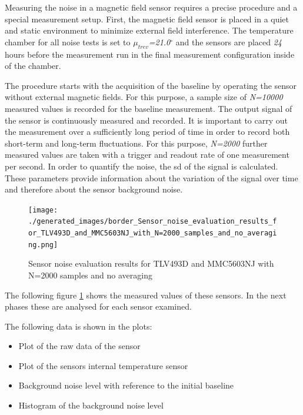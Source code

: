 Measuring the noise in a magnetic field sensor requires a precise
procedure and a special measurement setup. First, the magnetic field
sensor is placed in a quiet and static environment to minimize external
field interference. The temperature chamber for all noise tests is set
to \emph{\(\mu_{trev}\)=21.0\(^{\circ}\)} and the sensors are placed
\emph{24} hours before the measurement run in the final measurement
configuration inside of the chamber.

The procedure starts with the acquisition of the baseline by operating
the sensor without external magnetic fields. For this purpose, a sample
size of \emph{N=10000} measured values is recorded for the baseline
measurement. The output signal of the sensor is continuously measured
and recorded. It is important to carry out the measurement over a
sufficiently long period of time in order to record both short-term and
long-term fluctuations. For this purpose, \emph{N=2000} further measured
values are taken with a trigger and readout rate of one measurement per
second. In order to quantify the noise, the \gls{sd} of the signal is
calculated. These parameters provide information about the variation of
the signal over time and therefore about the sensor background noise.

\begin{figure}
\centering
\texttt{[image: ./generated\_images/border\_Sensor\_noise\_evaluation\_results\_for\_TLV493D\_and\_MMC5603NJ\_with\_N=2000\_samples\_and\_no\_averaging.png]}
\caption{Sensor noise evaluation results for TLV493D and MMC5603NJ with
N=2000 samples and no averaging
\label{Sensor_noise_evaluation_results_for_TLV493D_and_MMC5603NJ_with_N=2000_samples_and_no_averaging.png}}
\end{figure}

The following figure
\ref{Sensor_noise_evaluation_results_for_TLV493D_and_MMC5603NJ_with_N=2000_samples_and_no_averaging.png}
shows the measured values of these sensors. In the next phases these are
analysed for each sensor examined.

The following data is shown in the plots:

\begin{itemize}
\tightlist
\item
  Plot of the raw data of the sensor
\item
  Plot of the sensors internal temperature sensor
\item
  Background noise level with reference to the initial baseline
\item
  Histogram of the background noise level
\end{itemize}

